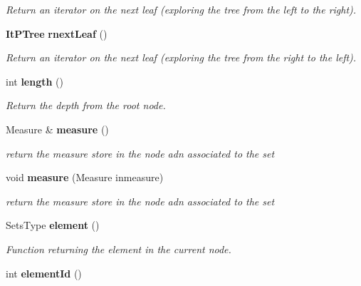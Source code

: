 \begin{CompactItemize}
\begin{CompactList}\small\item\em Return an iterator on the next leaf (exploring the tree from the left to the right). \item\end{CompactList}\item 
{\bf It\-PTree} {\bf rnext\-Leaf} ()\label{class_it_p_tree_61d94e058defaeb91643a535052bee70}

\begin{CompactList}\small\item\em Return an iterator on the next leaf (exploring the tree from the right to the left). \item\end{CompactList}\item 
int {\bf length} ()\label{class_it_p_tree_3aebe53355c21edb34cc2e25454a3fcf}

\begin{CompactList}\small\item\em Return the depth from the root node. \item\end{CompactList}\item 
Measure \& {\bf measure} ()\label{class_it_p_tree_daea7ce1f54bb2a0a396a59760eb395b}

\begin{CompactList}\small\item\em return the measure store in the node adn associated to the set \item\end{CompactList}\item 
void {\bf measure} (Measure inmeasure)\label{class_it_p_tree_e9b79aec7d04e65744343f3048abc372}

\begin{CompactList}\small\item\em return the measure store in the node adn associated to the set \item\end{CompactList}\item 
Sets\-Type {\bf element} ()\label{class_it_p_tree_df77aafe855d6c921977ecc2f5388f77}

\begin{CompactList}\small\item\em Function returning the element in the current node. \item\end{CompactList}\item 
int {\bf element\-Id} ()\label{class_it_p_tree_284b2f920da52b668a18aa6b12f5ec34}


\end{CompactItemize}
